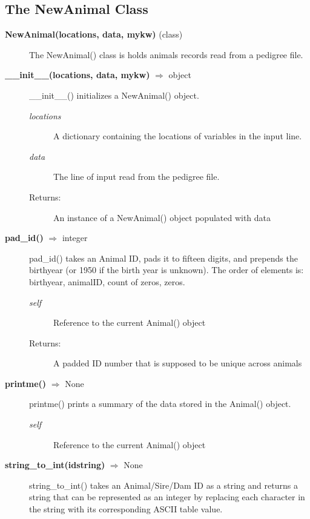 \subsection*{The NewAnimal Class}
\begin{description}
\item[\textbf{NewAnimal(locations, data, mykw)} (class)]
The NewAnimal() class is holds animals records read from a pedigree file.

\item[\textbf{\_\_init\_\_(locations, data, mykw)} $\Rightarrow$ object]
\_\_init\_\_() initializes a NewAnimal() object.
\begin{description}
\item[\emph{locations}] A dictionary containing the locations of variables in the input line.
\item[\emph{data}] The line of input read from the pedigree file.
\item[Returns:] An instance of a NewAnimal() object populated with data
\end{description}

\item[\textbf{pad\_id()} $\Rightarrow$ integer]
pad\_id() takes an Animal ID, pads it to fifteen digits, and prepends the birthyear (or 1950 if the birth year is unknown). The order of elements is: birthyear, animalID, count of zeros, zeros.
\begin{description}
\item[\emph{self}] Reference to the current Animal() object
\item[Returns:] A padded ID number that is supposed to be unique across animals
\end{description}

\item[\textbf{printme()} $\Rightarrow$ None]
printme() prints a summary of the data stored in the Animal() object.
\begin{description}
\item[\emph{self}] Reference to the current Animal() object
\end{description}


\item[\textbf{string\_to\_int(idstring)} $\Rightarrow$ None]
string\_to\_int() takes an Animal/Sire/Dam ID as a string and returns a string that can be represented as an integer by replacing each character in the string with its corresponding ASCII table value.


\end{description}
